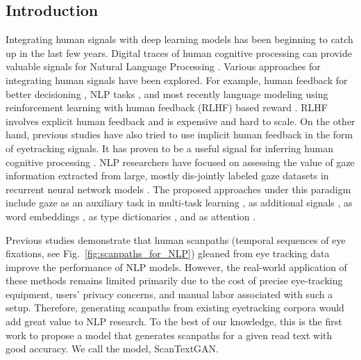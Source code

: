\subsection{Introduction}

Integrating human signals with deep learning models has been beginning to catch up in the last few years. Digital traces of human cognitive processing can provide valuable signals for Natural Language Processing \cite{klerke2016improving,plank-2016-keystroke}. Various approaches for integrating human signals have been explored. For example, human feedback for better decisioning \citep{christiano2017deep}, NLP tasks \citep{stiennon2020learning,wu2021recursively}, and most recently language modeling using reinforcement learning with human feedback (RLHF) based reward \citep{bai2022training,ouyang2022training}. RLHF involves explicit human feedback and is expensive and hard to scale. On the other hand, previous studies have also tried to use implicit human feedback in the form of eyetracking signals.
It has proven to be a useful signal for inferring human cognitive processing \cite{sood2020improving, hollenstein-zhang-2019-entity, ijcaiSurveyGapIdentified}. NLP researchers have focused on assessing the value of gaze information extracted from large, mostly dis-jointly labeled gaze datasets in recurrent neural network models \cite{ren-xiong-2021-cogalign,strzyz-etal-2019-towards,barrett-etal-2018-sequence}. The proposed approaches under this paradigm include gaze as an auxiliary task in multi-task learning \cite{klerke-etal-2016-improving,hollenstein2019advancing}, as additional signals \cite{mishra-etal-2016-harnessing}, as word embeddings \cite{barrett-etal-2018-unsupervised}, as type dictionaries \cite{barrett-etal-2016-weakly,hollenstein-zhang-2019-entity}, and
as attention \cite{barrett-etal-2018-sequence}. 

Previous studies demonstrate that human scanpaths (temporal sequences of eye fixations, see Fig.~\ref{fig:scanpaths_for_NLP}) gleaned from eye tracking data improve the performance of NLP models. However, the real-world application of these methods remains limited primarily due to the cost of precise eye-tracking equipment, users' privacy concerns, and manual labor associated with such a setup. Therefore, generating scanpaths from existing eyetracking corpora would add great value to NLP research. To the best of our knowledge, this is the first work to propose a model that generates scanpaths for a given read text with good accuracy. We call the model, ScanTextGAN.

